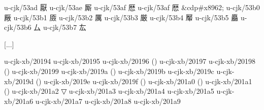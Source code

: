 \begin{multicols}{2}
[...] 
 
u-cjk/53ad	{\cjk{}厭}	 
u-cjk/53ae	{\cjk{}厮}	 
u-cjk/53af	{\cjk{}厯}	 
u-cjk/53af	{\cjk{}厯}	\&cdp\#x8962; 
u-cjk/53b0	{\cjk{}厰}	 
u-cjk/53b1	{\cjk{}厱}	 
u-cjk/53b2	{\cjk{}厲}	 
u-cjk/53b3	{\cjk{}厳}	 
u-cjk/53b4	{\cjk{}厴}	 
u-cjk/53b5	{\cjk{}厵}	 
u-cjk/53b6	{\cjk{}厶}	 
u-cjk/53b7	{\cjk{}厷}	 
 
[...] 
 
u-cjk-xb/20194	{	} 
u-cjk-xb/20195	{	} 
u-cjk-xb/20196	{	}() 
u-cjk-xb/20197	{	} 
u-cjk-xb/20198	{	}() 
u-cjk-xb/20199	{	} 
u-cjk-xb/2019a	{	}() 
u-cjk-xb/2019b	{	} 
u-cjk-xb/2019c	{	} 
u-cjk-xb/2019d	{	}() 
u-cjk-xb/2019e	{	} 
u-cjk-xb/2019f	{	}() 
u-cjk-xb/201a0	{	}() 
u-cjk-xb/201a1	{	}() 
u-cjk-xb/201a2	{	}▽ 
u-cjk-xb/201a3	{	} 
u-cjk-xb/201a4	{	} 
u-cjk-xb/201a5	{	} 
u-cjk-xb/201a6	{	} 
u-cjk-xb/201a7	{	} 
u-cjk-xb/201a8	{	} 
u-cjk-xb/201a9	{	} 
 

\end{multicols}
